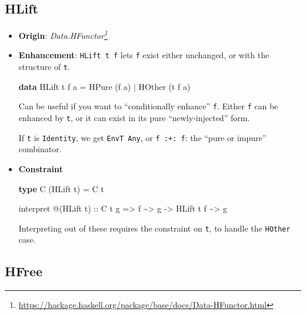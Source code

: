 \documentclass[]{article}
\newenvironment{Shaded}{}{}
\newcommand{\DataTypeTok}[1]{\textcolor[rgb]{0.56,0.13,0.00}{#1}}
\newcommand{\KeywordTok}[1]{\textcolor[rgb]{0.00,0.44,0.13}{\textbf{#1}}}
\newcommand{\NormalTok}[1]{#1}
\newcommand{\OperatorTok}[1]{\textcolor[rgb]{0.40,0.40,0.40}{#1}}
\newcommand{\OtherTok}[1]{\textcolor[rgb]{0.00,0.44,0.13}{#1}}
\renewcommand{\href}[2]{#2\footnote{\url{#1}}}
\begin{document}
\hypertarget{hlift}{%
\subsection{HLift}\label{hlift}}

\begin{itemize}
\item
  \textbf{Origin}:
  \emph{\href{https://hackage.haskell.org/package/base/docs/Data-HFunctor.html}{Data.HFunctor}}
\item
  \textbf{Enhancement}: \texttt{HLift\ t\ f} lets \texttt{f} exist either
  unchanged, or with the structure of \texttt{t}.

\begin{Shaded}
\begin{Highlighting}[]
\KeywordTok{data} \DataTypeTok{HLift}\NormalTok{ t f a}
    \OtherTok{=} \DataTypeTok{HPure}\NormalTok{  (f a)}
    \OperatorTok{|} \DataTypeTok{HOther}\NormalTok{ (t f a)}
\end{Highlighting}
\end{Shaded}

  Can be useful if you want to ``conditionally enhance'' \texttt{f}. Either
  \texttt{f} can be enhanced by \texttt{t}, or it can exist in its pure
  ``newly-injected'' form.

  If \texttt{t} is \texttt{Identity}, we get \texttt{EnvT\ Any}, or
  \texttt{f\ :+:\ f}: the ``pure or impure'' combinator.
\item
  \textbf{Constraint}

\begin{Shaded}
\begin{Highlighting}[]
\KeywordTok{type} \DataTypeTok{C}\NormalTok{ (}\DataTypeTok{HLift}\NormalTok{ t) }\OtherTok{=} \DataTypeTok{C}\NormalTok{ t}

\NormalTok{interpret }\OperatorTok{@}\NormalTok{(}\DataTypeTok{HLift}\NormalTok{ t)}
\OtherTok{    ::} \DataTypeTok{C}\NormalTok{ t g}
    \OtherTok{=>}\NormalTok{ f }\OperatorTok{\textasciitilde{}>}\NormalTok{ g}
    \OtherTok{{-}>} \DataTypeTok{HLift}\NormalTok{ t f }\OperatorTok{\textasciitilde{}>}\NormalTok{ g}
\end{Highlighting}
\end{Shaded}

  Interpreting out of these requires the constraint on \texttt{t}, to handle the
  \texttt{HOther} case.
\end{itemize}

\hypertarget{hfree}{%
\subsection{HFree}\label{hfree}}
\end{document}
